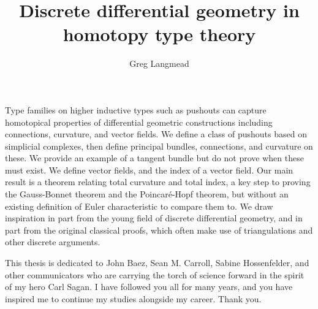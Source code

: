 \documentclass[12pt,fleqn]{article}
\title{Discrete differential geometry in homotopy type theory}
\author{Greg Langmead}
\numberwithin{equation}{section}
\renewenvironment{abstract}{\section*{\abstractname}}{}
\begin{document}
\maketitle

\begin{abstract}
Type families on higher inductive types such as pushouts can capture homotopical properties of differential geometric constructions including connections, curvature, and vector fields. We define a class of pushouts based on simplicial complexes, then define principal bundles, connections, and curvature on these. We provide an example of a tangent bundle but do not prove when these must exist. We define vector fields, and the index of a vector field. Our main result is a theorem relating total curvature and total index, a key step to proving the Gauss-Bonnet theorem and the Poincaré-Hopf theorem, but without an existing definition of Euler characteristic to compare them to. We draw inspiration in part from the young field of discrete differential geometry, and in part from the original classical proofs, which often make use of triangulations and other discrete arguments.
\end{abstract}

\begin{dedication}
This thesis is dedicated to John Baez, Sean M. Carroll, Sabine Hossenfelder, and other communicators who are carrying the torch of science forward in the spirit of my hero Carl Sagan. I have followed you all for many years, and you have inspired me to continue my studies alongside my career. Thank you.
\end{dedication}

\clearpage


\tableofcontents 
\clearpage

\clearpage

\clearpage

\clearpage

\clearpage

\clearpage

\clearpage
\appendix

\clearpage


\end{document}
